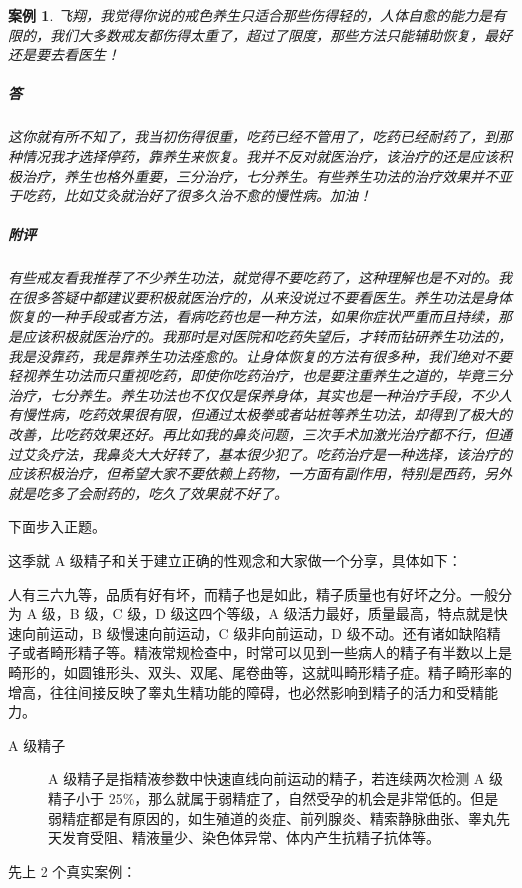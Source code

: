 \documentclass{ctexart}
\newtheorem{case}{案例}
\begin{document}
\begin{case}
    飞翔，我觉得你说的戒色养生只适合那些伤得轻的，人体自愈的能力是有限的，我们大多数戒友都伤得太重了，超过了限度，那些方法只能辅助恢复，最好还是要去看医生！
    \subparagraph{答} 这你就有所不知了，我当初伤得很重，吃药已经不管用了，吃药已经耐药了，到那种情况我才选择停药，靠养生来恢复。我并不反对就医治疗，该治疗的还是应该积极治疗，养生也格外重要，三分治疗，七分养生。有些养生功法的治疗效果并不亚于吃药，比如艾灸就治好了很多久治不愈的慢性病。加油！
    \subparagraph{附评} 有些戒友看我推荐了不少养生功法，就觉得不要吃药了，这种理解也是不对的。我在很多答疑中都建议要积极就医治疗的，从来没说过不要看医生。养生功法是身体恢复的一种手段或者方法，看病吃药也是一种方法，如果你症状严重而且持续，那是应该积极就医治疗的。我那时是对医院和吃药失望后，才转而钻研养生功法的，我是没靠药，我是靠养生功法痊愈的。让身体恢复的方法有很多种，我们绝对不要轻视养生功法而只重视吃药，即使你吃药治疗，也是要注重养生之道的，毕竟三分治疗，七分养生。养生功法也不仅仅是保养身体，其实也是一种治疗手段，不少人有慢性病，吃药效果很有限，但通过太极拳或者站桩等养生功法，却得到了极大的改善，比吃药效果还好。再比如我的鼻炎问题，三次手术加激光治疗都不行，但通过艾灸疗法，我鼻炎大大好转了，基本很少犯了。吃药治疗是一种选择，该治疗的应该积极治疗，但希望大家不要依赖上药物，一方面有副作用，特别是西药，另外就是吃多了会耐药的，吃久了效果就不好了。
\end{case}

下面步入正题。

这季就 A 级精子和关于建立正确的性观念和大家做一个分享，具体如下：

人有三六九等，品质有好有坏，而精子也是如此，精子质量也有好坏之分。一般分为 A 级，B 级，C 级，D 级这四个等级，A 级活力最好，质量最高，特点就是快速向前运动，B 级慢速向前运动，C 级非向前运动，D 级不动。还有诸如缺陷精子或者畸形精子等。精液常规检查中，时常可以见到一些病人的精子有半数以上是畸形的，如圆锥形头、双头、双尾、尾卷曲等，这就叫畸形精子症。精子畸形率的增高，往往间接反映了睾丸生精功能的障碍，也必然影响到精子的活力和受精能力。

\begin{description}
    \item[A 级精子] A 级精子是指精液参数中快速直线向前运动的精子，若连续两次检测 A 级精子小于 25\%，那么就属于弱精症了，自然受孕的机会是非常低的。但是弱精症都是有原因的，如生殖道的炎症、前列腺炎、精索静脉曲张、睾丸先天发育受阻、精液量少、染色体异常、体内产生抗精子抗体等。
\end{description}

先上 2 个真实案例：
\end{document}
